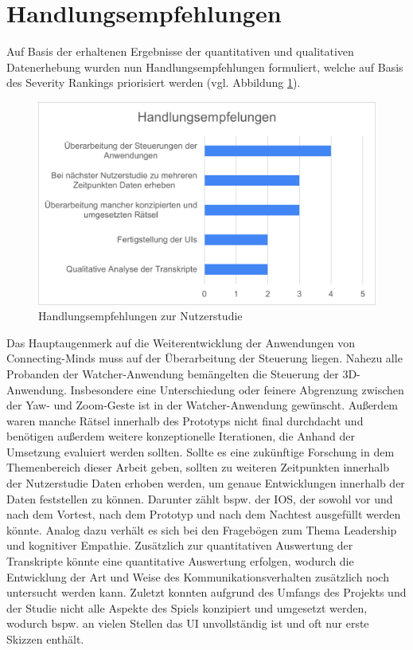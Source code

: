 \section{Handlungsempfehlungen}
Auf Basis der erhaltenen Ergebnisse der quantitativen und qualitativen Datenerhebung wurden nun Handlungsempfehlungen formuliert, welche auf Basis des Severity Rankings priorisiert werden (vgl. Abbildung \ref{fig:call_to_actions_user_study}).

\begin{figure}[ht]
\centering
\includegraphics[width=1\linewidth]{content/pictures/Handlungsempfehlung_Nutzerstudie.png}
\caption{Handlungsempfehlungen zur Nutzerstudie}
\label{fig:call_to_actions_user_study}
\end{figure}

Das Hauptaugenmerk auf die Weiterentwicklung der Anwendungen von Connecting-Minds muss auf der Überarbeitung der Steuerung liegen. Nahezu alle Probanden der Watcher-Anwendung bemängelten die Steuerung der 3D-Anwendung. Insbesondere eine Unterschiedung oder feinere Abgrenzung zwischen der Yaw- und Zoom-Geste ist in der Watcher-Anwendung gewünscht. Außerdem waren manche Rätsel innerhalb des Prototyps nicht final durchdacht und benötigen außerdem weitere konzeptionelle Iterationen, die Anhand der Umsetzung evaluiert werden sollten. 
Sollte es eine zukünftige Forschung in dem Themenbereich dieser Arbeit geben, sollten zu weiteren Zeitpunkten innerhalb der Nutzerstudie Daten erhoben werden, um genaue Entwicklungen innerhalb der Daten feststellen zu können. Darunter zählt bspw. der \ac{IOS}, der sowohl vor und nach dem Vortest, nach dem Prototyp und nach dem Nachtest ausgefüllt werden könnte. Analog dazu verhält es sich bei den Fragebögen zum Thema Leadership und kognitiver Empathie. 
Zusätzlich zur quantitativen Auswertung der Transkripte könnte eine quantitative Auswertung erfolgen, wodurch die Entwicklung der Art und Weise des Kommunikationsverhalten zusätzlich noch untersucht werden kann. Zuletzt konnten aufgrund des Umfangs des Projekts und der Studie nicht alle Aspekte des Spiels konzipiert und umgesetzt werden, wodurch bspw. an vielen Stellen das \ac{UI} unvollständig ist und oft nur erste Skizzen enthält.

